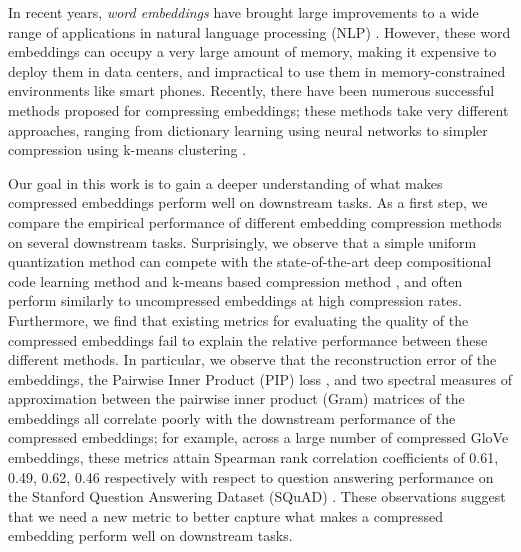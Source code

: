 In recent years, \textit{word embeddings} \citep{word2vec13,glove14,fasttext18} have brought large improvements to a wide range of applications in natural language processing (NLP) \citep{collins16,drqa17}.
However, these word embeddings can occupy a very large amount of memory, making it expensive to deploy them in data centers, and impractical to use them in memory-constrained environments like smart phones.
Recently, there have been numerous successful methods proposed for compressing embeddings;
these methods take very different approaches, ranging from dictionary learning using neural networks \citep{dccl17,kway18} to simpler compression using k-means clustering  \citep{andrews16}. %

Our goal in this work is to gain a deeper understanding of what makes compressed embeddings perform well on downstream tasks.
As a first step, we compare the empirical performance of different embedding compression methods on several downstream tasks.
Surprisingly, we observe that a simple uniform quantization method can compete with the state-of-the-art deep compositional code learning method \citep{dccl17} and k-means based compression method \citep{andrews16}, and often perform similarly to uncompressed embeddings at high compression rates.
Furthermore, we find that existing metrics for evaluating the quality of the compressed embeddings fail to explain the relative performance between these different methods.
In particular, we observe that the reconstruction error of the embeddings, the Pairwise Inner Product (PIP) loss \citep{yin18}, and two spectral measures of approximation between the pairwise inner product (Gram) matrices of the embeddings \citep{avron17,lprff18} all correlate poorly with the downstream performance of the compressed embeddings;
for example, across a large number of compressed GloVe embeddings, these metrics attain Spearman rank correlation coefficients of 0.61, 0.49, 0.62, 0.46 respectively with respect to question answering performance on the Stanford Question Answering Dataset (SQuAD) \citep{squad16}.
These observations suggest that we need a new metric to better capture what makes a compressed embedding perform well on downstream tasks.

